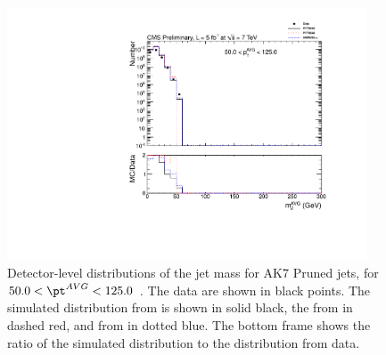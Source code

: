 \fi

\clearpage

\ifnpas

\begin{figure}[htbp]
\centering
\includegraphics[width=0.95\textwidth]{figs/histAK7MjetVsPtAvg_rawDataMCComparisons_pt_1_Pruned}
\caption{Detector-level distributions of the jet mass for AK7 Pruned jets,
for $50.0 < \pt^{AVG} < 125.0$ \GeVc. The data are shown in black points.
The simulated distribution from \PYTHIA is shown in solid black, 
the from \PYTHIAEIGHT in dashed red, and from \HERWIG in dotted blue. 
The bottom frame shows the ratio of the simulated distribution
to the distribution from data. 
\label{figs:histAK7MjetVsPtAvg_rawDataMCComparisons_pt_1_Pruned}}
\end{figure}

\fi

